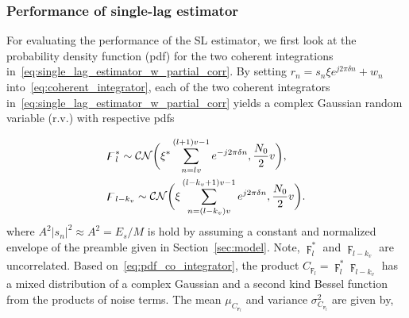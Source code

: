 


\subsubsection{Performance of single-lag estimator}

For evaluating the performance of the SL estimator,
we first look at the probability density function (pdf)
for the two coherent integrations in~\eqref{eq:single_lag_estimator_w_partial_corr}.
By setting $r_n=s_n\xi e^{j2\pi \delta n}+w_n$ into~\eqref{eq:coherent_integrator}, each of
the two coherent integrators in~\eqref{eq:single_lag_estimator_w_partial_corr} yields a complex Gaussian
random variable (r.v.) with respective pdfs

\begin{equation}
  \label{eq:pdf_co_integrator}
  \begin{aligned}
    &\digamma_l^* \sim \mathcal{CN}\bigg(\xi^*\sum_{n=lv}^{(l+1)v-1}e^{-j2\pi \delta n},\frac{N_0}{2}v\bigg), \\
    &\digamma_{l-k_v} \sim \mathcal{CN}\bigg(\xi\sum_{n=(l-k_v)v}^{(l-k_v+1)v-1}e^{j2\pi \delta n},\frac{N_0}{2}v\bigg).
  \end{aligned}
\end{equation}
where $A^2|s_n|^2 \approx A^2= E_s/M$ is hold by assuming a constant and normalized envelope of the preamble given in Section~\ref{sec:model}.
Note, $\digamma_l^*$ and $\digamma_{l-k_v}$ are uncorrelated. Based on~\eqref{eq:pdf_co_integrator}, 
the product $C_{\digamma_{l}}=\digamma_l^*\digamma_{l-k_v}$ has a mixed distribution of a complex Gaussian and a
second kind Bessel function from the products of noise terms.
The mean $\mu_{C_{\digamma_{l}}}$ and variance $\sigma^2_{C_{\digamma_{l}}}$ are given by, 

